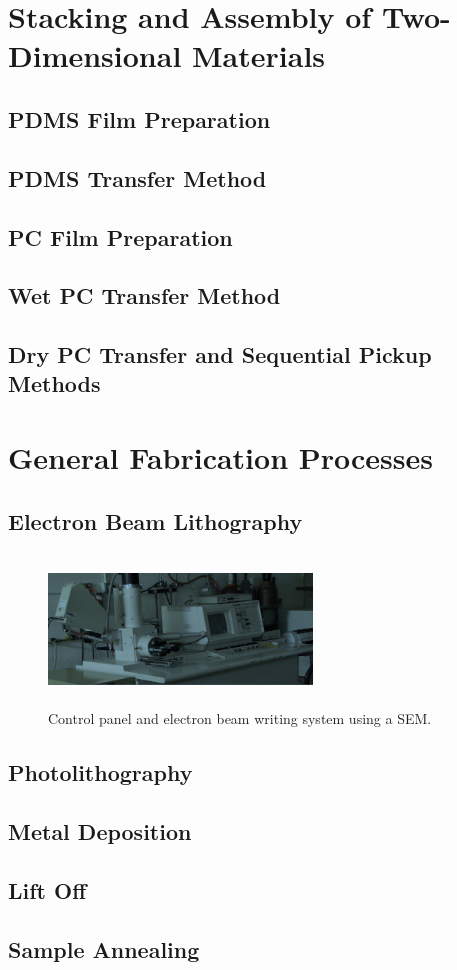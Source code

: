\section{Stacking and Assembly of Two-Dimensional Materials}\label{sec:transfer}
\subsection{PDMS Film Preparation}\label{subsec:pdms_prep}
\subsection{PDMS Transfer Method}\label{subsec:pdms_transfer}
\subsection{PC Film Preparation}\label{subsec:pc_prep}
\subsection{Wet PC Transfer Method}\label{subsec:_wet_pc_transfer}
\subsection{Dry PC Transfer and Sequential Pickup Methods}\label{subsec:dry_pc_transfer}

\section{General Fabrication Processes}\label{sec:fab_processes}
\subsection{Electron Beam Lithography}\label{subsec:ebl}
\begin{figure}[ht]
    \centering
    \includegraphics[height=4cm,width=7cm]{SEM}
    \caption[Scanning electron microscope]{Control panel and electron beam writing system using a \acs{SEM}.}
\end{figure} 
\subsection{Photolithography}\label{subsec:photo_lithography}
\subsection{Metal Deposition}\label{subsec:metal_deposition}
\subsection{Lift Off}\label{subsec:lift_off}
\subsection{Sample Annealing}\label{subsec:annealing}
